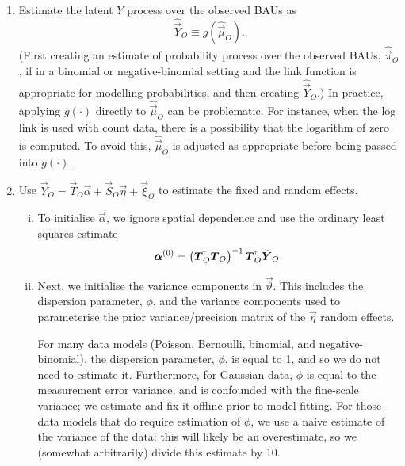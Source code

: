 \documentclass[12pt,a4paper]{article}
\begin{document}
\begin{appendices}
\begin{enumerate}
    \item\label{step_Y_O} Estimate the latent $Y$ process over the observed BAUs as
    \[
    \hat{\vec{Y}}_O \equiv g(\hat{\vec{\mu}}_O).
    \]
    (First creating an estimate of probability process over the observed BAUs, $\hat{\vec{\pi}}_O$, if in a binomial or negative-binomial setting and the link function is appropriate for modelling probabilities, and then creating $\hat{\vec{Y}}_O$.) 
    In practice, applying $g(\cdot)$ directly to $\hat{\vec{\mu}}_O$ can be problematic. For instance, when the log link is used with count data, there is a possibility that the logarithm of zero is computed. To avoid this, $\hat{\vec{\mu}}_O$ is adjusted as appropriate before being passed into $g(\cdot)$.
    \item Use $\vec{Y}_O = \vec{T}_O \vec{\alpha} + \vec{S}_O \vec{\eta} + \vec{\xi}_O$ to estimate the fixed and random effects. 
    \begin{enumerate}[i.]
        \item\label{step_alpha} To initialise $\vec{\alpha}$, we ignore spatial dependence and use the ordinary least squares estimate
        \[
        \vec{\alpha}^{(0)} = \left(\vec{T}_O^\tp \vec{T}_O\right)^{-1}\vec{T}_O^\tp \hat{\vec{Y}}_O.
        \]
        \item Next, we initialise the variance components in $\vec{\vartheta}$. This includes the dispersion parameter, $\phi$, and the variance components used to parameterise the prior variance/precision matrix of the $\vec{\eta}$ random effects. 
        
        
        For many data models (Poisson, Bernoulli, binomial, and negative-binomial), the dispersion parameter, $\phi$, is equal to 1, and so we do not need to estimate it. Furthermore, for Gaussian data, $\phi$ is equal to the measurement error variance, and is confounded with the fine-scale variance; we estimate and fix it offline prior to model fitting.  
        For those data models that do require estimation of $\phi$, we use a naive estimate of the variance of the data; this will likely be an overestimate, so we (somewhat arbitrarily) divide this estimate by 10. 
        

\end{enumerate}
\end{enumerate}
\end{appendices}
\end{document}
